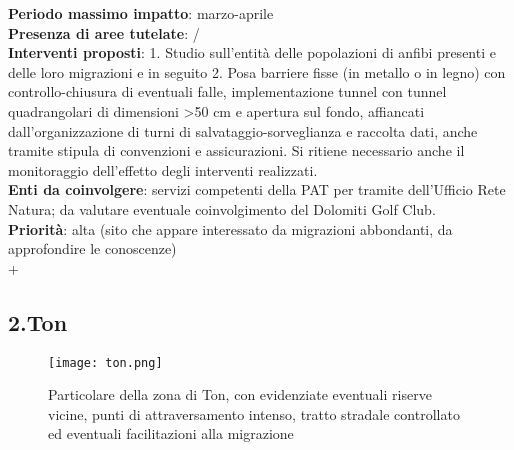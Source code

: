 \documentclass[11pt,a4paper,twoside]{memoir}
\begin{document}
\textbf{Periodo massimo impatto}: marzo-aprile \\
\textbf{Presenza di aree tutelate}: / \\
\textbf{Interventi proposti}: 1. Studio sull'entità delle popolazioni di anfibi presenti e delle loro migrazioni e in seguito 2. Posa barriere fisse (in metallo o in legno) con controllo-chiusura di eventuali falle, implementazione tunnel con tunnel quadrangolari di dimensioni >50 cm e apertura sul fondo, affiancati dall'organizzazione di turni di salvataggio-sorveglianza e raccolta dati, anche tramite stipula di convenzioni e assicurazioni. Si ritiene necessario anche il monitoraggio dell’effetto degli interventi realizzati. \\
\textbf{Enti da coinvolgere}: servizi competenti della PAT per tramite dell’Ufficio Rete Natura; da valutare eventuale coinvolgimento del Dolomiti Golf Club. \\
\textbf{Priorità}: alta (sito che appare interessato da migrazioni abbondanti, da approfondire le conoscenze) \\

\newpage+
\begin{tcolorbox}[breakable,colback=white,colframe=red,width=10cm]
\subsection{2.Ton}
\end{tcolorbox}

\begin{figure}[H]
\label{fig:map_ton}
\centering
  \texttt{[image: ton.png]}
\caption{Particolare della zona di Ton, con evidenziate eventuali riserve vicine, punti di attraversamento intenso, tratto stradale controllato ed eventuali facilitazioni alla migrazione}
\end{figure}
\end{document}
